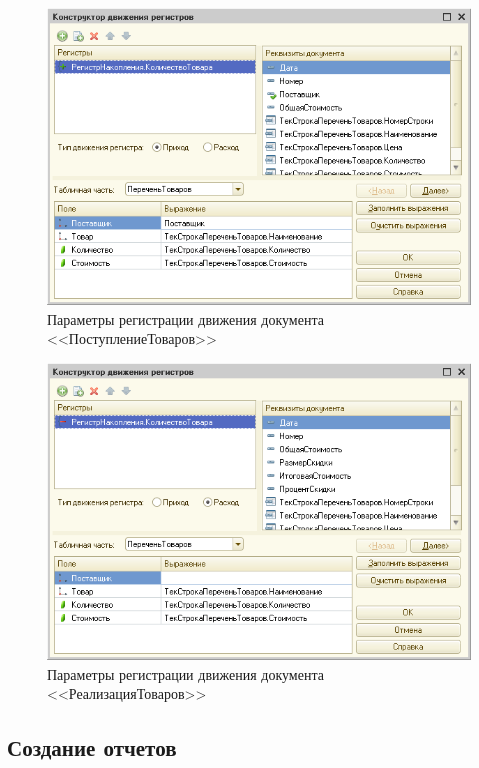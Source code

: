 \begin{figure}[h!]
  \centering
  \includegraphics[width=130mm]{pic/reg_doc_input}
  \caption{Параметры регистрации движения документа <<ПоступлениеТоваров>>}
  \label{fig:reg_doc_input}
\end{figure}

\begin{figure}[h!]
  \centering
  \includegraphics[width=130mm]{pic/reg_doc_output}
  \caption{Параметры регистрации движения документа <<РеализацияТоваров>>}
  \label{fig:reg_doc_output}
\end{figure}

\pagebreak

\subsection{Создание отчетов}

